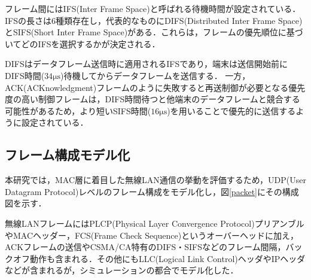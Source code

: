 \documentclass[a4paper, 10pt]{ltjsarticle}
\begin{document}
フレーム間にはIFS(Inter Frame Space)と呼ばれる待機時間が設定されている．IFSの長さは6種類存在し，代表的なものにDIFS(Distributed Inter Frame Space)とSIFS(Short Inter Frame Space)がある．これらは，フレームの優先順位に基づいてどのIFSを選択するかが決定される．

DIFSはデータフレーム送信時に適用されるIFSであり，端末は送信開始前にDIFS時間($34\mathrm{\mu s}$)待機してからデータフレームを送信する．
一方，ACK(ACKnowledgment)フレームのように失敗すると再送制御が必要となる優先度の高い制御フレームは，DIFS時間待つと他端末のデータフレームと競合する可能性があるため，より短いSIFS時間($16\mathrm{\mu s}$)を用いることで優先的に送信するように設定されている．




\subsection{フレーム構成モデル化}

本研究では，MAC層に着目した無線LAN通信の挙動を評価するため，UDP(User Datagram Protocol)レベルのフレーム構成をモデル化し，図\ref{packet}にその構成図を示す．

無線LANフレームにはPLCP(Physical Layer Convergence Protocol)プリアンブルやMACヘッダー，FCS(Frame Check Sequence)というオーバーヘッドに加え，ACKフレームの送信やCSMA/CA特有のDIFS・SIFSなどのフレーム間隔，バックオフ動作も含まれる．その他にもLLC(Logical Link Control)ヘッダやIPヘッダなどが含まれるが，シミュレーションの都合でモデル化した．





\end{document}
